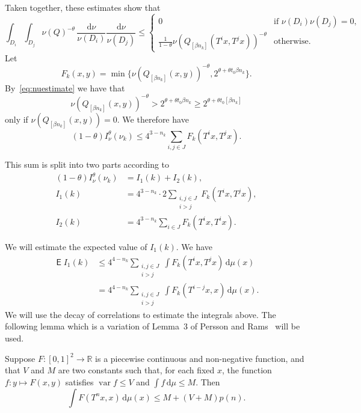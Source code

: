 \documentclass[AHL,Unicode,longabstracts]{cedram}
\DeclareMathOperator{\E}{\mathsf{E}}
\DeclareMathOperator{\var}{var}
\newcommand*{\dd}{\mathrm{d}}
\begin{document}
Taken together, these estimates show that
\[
\int_{D_i} \int_{D_j} \nu (Q)^{-\theta} \, \frac{\dd \nu}{\nu (D_i)} \frac{\dd \nu}{\nu (D_j)} \leq
\left\{
\begin{array}{ll} 0 & \text{if } \nu (D_i) \nu (D_j) = 0,
\\ \frac{1}{1-\theta} \nu (Q_{[\beta n_k]} (T^i x, T^j x))^{-\theta} & \text{otherwise}.
\end{array} \right.
\]
Let
\[
F_k (x,y) = \min\{\nu (Q_{[\beta n_k]} (x, y))^{-\theta}, 2^{\theta + \theta t_0 \beta n_k} \}.
\]
By~\eqref{eq:nuestimate} we have that
\[
\nu (Q_{[\beta n_k]} (x, y))^{-\theta} > 2^{\theta + \theta t_0 \beta n_k} \geq 2^{\theta + \theta t_0 [\beta n_k]}
\]
only if $\nu (Q_{[\beta n_k]} (x, y)) = 0$. We therefore have
\[
(1- \theta) I_\nu^\theta (\nu_k) \leq 4^{3-n_k} \sum_{i,j \in J} F_k (T^i x, T^j x).
\]

This sum is split into two parts according to
\begin{align*}
(1 - \theta) I_\nu^\theta (\nu_k) &= I_1 (k) + I_2 (k), \\ I_1 (k) &= 4^{3 - n_k} \cdot 2 \sum_{\substack{i,j \in J \\i>j}} F_k (T^i x, T^j x),
\\ I_2 (k) &= 4^{3 - n_k} \sum_{i \in J} F_k (T^i x, T^i x).
\end{align*}

We will estimate the expected value of $I_1 (k)$. We have
\begin{align*}
\E I_1 (k) & \leq 4^{4-n_k} \sum_{\substack{i,j \in J \\i>j}} \int F_k (T^i x, T^j x) \, \dd \mu (x) \\ &= 4^{4-n_k}
\sum_{\substack{i,j \in J \\ i>j}} \int F_k (T^{i-j} x, x) \,
\dd \mu (x).
\end{align*}
We will use the decay of correlations to estimate the integrals above. The following lemma which is a variation of Lemma~3 of Persson and Rams~\cite{perssonrams} will be used.

\begin{lemm}\label{lem:perssonrams}
Suppose $F \colon [0,1]^2 \to \mathbb{R}$ is a piecewise continuous and non-negative function, and that $V$ and $M$ are two constants such that, for each fixed $x$, the function $f \colon y \mapsto F(x,y)$ satisfies $\var f \leq V$ and $\int f \, \dd\mu \leq M$. Then
\[
\int F(T^n x, x) \, \dd\mu (x) \leq M + (V + M) p (n).
\]
\end{lemm}
\end{document}
